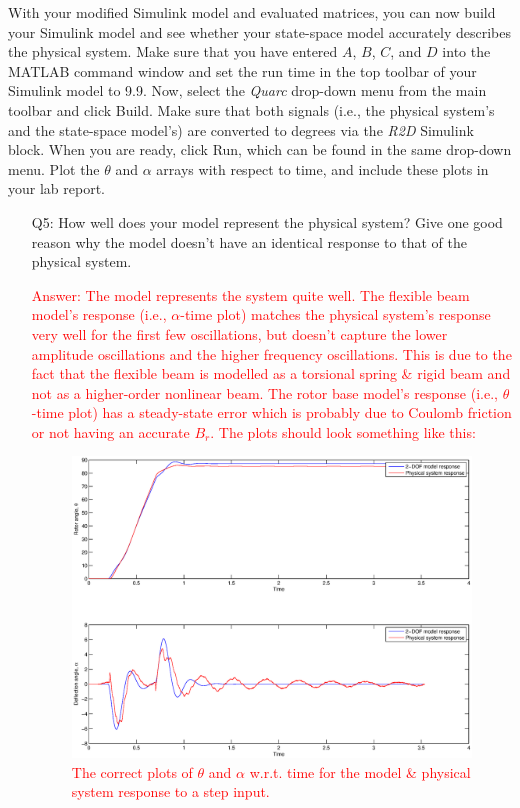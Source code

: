\documentclass[12pt]{report}
\newcommand\drew[1]{\textcolor{red}{#1}}
\begin{document}
With your modified Simulink model and evaluated matrices, you can now build your Simulink model and see whether your state-space model accurately describes the physical system. Make sure that you have entered $A$, $B$, $C$, and $D$ into the MATLAB command window and set the run time in the top toolbar of your Simulink model to 9.9. Now, select the \emph{Quarc} drop-down menu from the main toolbar and click Build. Make sure that both signals (i.e., the physical system's and the state-space model's) are converted to degrees via the \emph{R2D} Simulink block. When you are ready, click Run, which can be found in the same drop-down menu. Plot the $\theta$ and $\alpha$ arrays with respect to time, and include these plots in your lab report.
\begin{enumerate}[Question]
    \item[Q5:] How well does your model represent the physical system? Give one good reason why the model doesn't have an identical response to that of the physical system.\\
          \drew{Answer: The model represents the system quite well. The flexible beam model's response (i.e., $\alpha$-time plot) matches the physical system's response very well for the first few oscillations, but doesn't capture the lower amplitude oscillations and the higher frequency oscillations. This is due to the fact that the flexible beam is modelled as a torsional spring \& rigid beam and not as a higher-order nonlinear beam. The rotor base model's response (i.e., $\theta$-time plot) has a steady-state error which is probably due to Coulomb friction or not having an accurate $B_r$. The plots should look something like this:
              \begin{figure}[htb!]
                  \centering
                  \includegraphics[width=.8\linewidth]{eps/lab_1/model_validation_plots.eps}
                  \caption{The correct plots of $\theta$ and $\alpha$ w.r.t. time for the model \& physical system response to a step input.}
                  \label{fig:lab1_model_validation__step2to0}
              \end{figure}
          }
\end{enumerate}
\end{document}

